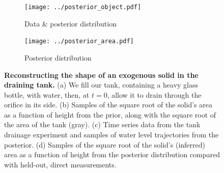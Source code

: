 \documentclass[openacc]{rsproca_new}%
\begin{document}
\begin{figure}[h!]
     \begin{subfigure}[b]{0.49\textwidth}
    	\texttt{[image: ../posterior\_object.pdf]}
	\caption{Data \& posterior distribution} \label{fig:posterior_object}
    \end{subfigure}
    \begin{subfigure}[b]{0.49\textwidth}
    	\texttt{[image: ../posterior\_area.pdf]}
	\caption{Posterior distribution} \label{fig:posterior_area}
    \end{subfigure}
    \caption{
      \textbf{Reconstructing the shape of an exogenous solid in the draining tank.} 
      (a) We fill our tank, containing a heavy glass bottle, with water, then, at $t=0$, allow it to drain through the orifice in its side.
      (b) Samples of the square root of the solid's area as a function of height from the prior, along with the square root of the area of the tank (gray). 
      (c) Time series data from the tank drainage experiment and samples of water level trajectories from the posterior.
      (d) Samples of the square root of the solid's (inferred) area as a function of height from the posterior distribution compared with held-out, direct measurements.
      }
\end{figure}
\end{document}
